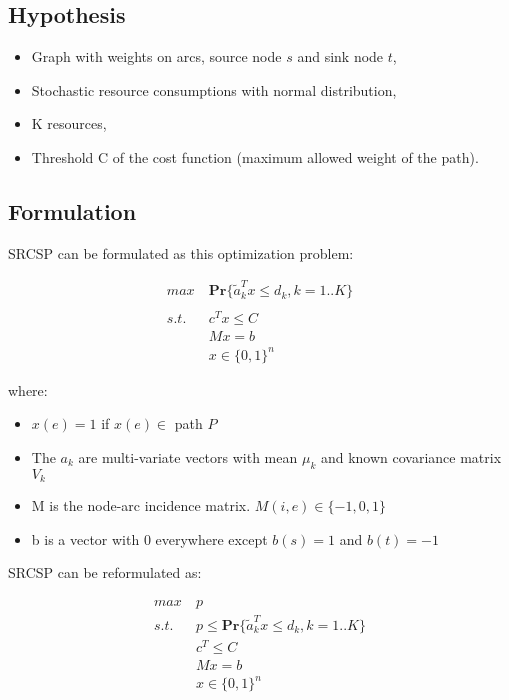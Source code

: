 \documentclass{beamer}
\begin{document}
\subsection{Hypothesis}
\begin{frame}
	\begin{itemize}
		\item Graph with weights on arcs, source node $s$ and sink node $t$,
		\item Stochastic resource consumptions with normal distribution,
		\item K resources,
		\item Threshold C of the cost function (maximum allowed weight of the path).
	\end{itemize}
\end{frame}

\subsection{Formulation}
\begin{frame}

SRCSP can be formulated as this optimization problem:

\begin{align*}
 max\ &\mathbf{Pr} \{ \tilde{a}_k^Tx \leq d_k, k=1..K \} \\ \\
 s.t.\ &c^T x \leq C \\
 &Mx = b \\
 &x \in \{0, 1\}^n
\end{align*}

where:

\begin{itemize}
	\item $x(e) = 1$ if $x(e) \in $ path $P$
	\item The $a_k$ are multi-variate vectors with mean $\mu_k$ and known covariance matrix $V_k$
	\item M is the node-arc incidence matrix. $M(i, e) \in \{-1, 0, 1\}$
	\item b is a vector with 0 everywhere except $b(s) = 1$ and $b(t) = -1$
\end{itemize}

\end{frame}

\begin{frame}

SRCSP can be reformulated as:

\begin{align*}
 max\ & p\\
 s.t.\ & p \leq \mathbf{Pr} \{ \tilde{a}_k^Tx \leq d_k, k=1..K \} \\
 & c^T \leq C \\
 & Mx = b \\
 & x \in \{0, 1\}^n
\end{align*}

\end{frame}
\end{document}
